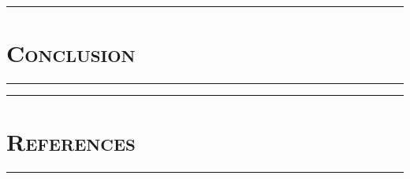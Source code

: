 \documentclass[10pt]{article} %
\begin{document}
\begin{center}
    \par\noindent\rule{\textwidth}{0.2pt}
    \section*{\textsc{\textmd{Conclusion}}}
    \par\noindent\rule{\textwidth}{0.2pt}
\end{center}


\begin{center}
    \par\noindent\rule{\textwidth}{0.2pt}
    \section*{\textsc{\textmd{References}}}
    \par\noindent\rule{\textwidth}{0.2pt}
\end{center}

\begingroup
\renewcommand{\section}[2]{}%


\endgroup
\end{document}
